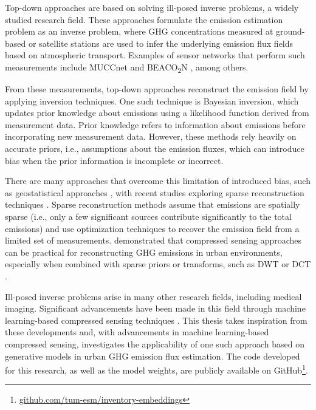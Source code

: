 Top-down approaches are based on solving ill-posed inverse problems, a widely studied research field.
These approaches formulate the emission estimation problem as an inverse problem, where \gls{GHG} concentrations measured at ground-based or satellite stations are used to infer the underlying emission flux fields based on atmospheric transport.
Examples of sensor networks that perform such measurements include MUCCnet \parencite{MUCCnet} and BEACO\textsubscript{2}N \parencite{BEACON2N}, among others.

From these measurements, top-down approaches reconstruct the emission field by applying inversion techniques.
One such technique is Bayesian inversion, which updates prior knowledge about emissions using a likelihood function derived from measurement data.
Prior knowledge refers to information about emissions before incorporating new measurement data.
However, these methods rely heavily on accurate priors, i.e., assumptions about the emission fluxes, which can introduce bias when the prior information is incomplete or incorrect.

There are many approaches that overcome this limitation of introduced bias, such as geostatistical approaches \parencite{Geostatical}, with recent studies exploring sparse reconstruction techniques \parencite{UrbanSparseReconstruction}. %
Sparse reconstruction methods assume that emissions are spatially sparse (i.e., only a few significant sources contribute significantly to the total emissions) and use optimization techniques to recover the emission field from a limited set of measurements.
\textcite{UrbanSparseReconstruction} demonstrated that compressed sensing approaches can be practical for reconstructing \gls{GHG} emissions in urban environments, especially when combined with sparse priors or transforms, such as \gls{DWT} \parencite{Wavelets} or \gls{DCT} \parencite{DCT}.

Ill-posed inverse problems arise in many other research fields, including medical imaging.
Significant advancements have been made in this field through machine learning-based compressed sensing techniques \parencite{ReviewCSUsingAI}.
This thesis takes inspiration from these developments and, with advancements in machine learning-based compressed sensing, investigates the applicability of one such approach based on generative models in urban \gls{GHG} emission flux estimation.
The code developed for this research, as well as the model weights, are publicly available on GitHub\footnote{\href{https://github.com/tum-esm/inventory-embeddings}{github.com/tum-esm/inventory-embeddings}}.
